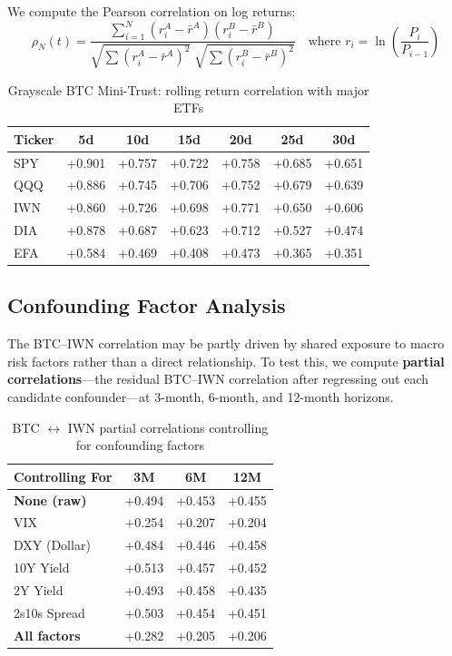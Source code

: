 \documentclass[11pt,letterpaper]{article}
\begin{document}
We compute the Pearson correlation on log returns:
\[
  \rho_{N}(t) = \frac{\sum_{i=1}^{N}(r^{A}_i - \bar{r}^{A})(r^{B}_i - \bar{r}^{B})}
  {\sqrt{\sum(r^{A}_i - \bar{r}^{A})^2}\;\sqrt{\sum(r^{B}_i - \bar{r}^{B})^2}}
  \quad\text{where } r_i = \ln\!\left(\frac{P_i}{P_{i-1}}\right)
\]

\begin{table}[H]
\centering
\caption{Grayscale BTC Mini-Trust: rolling return correlation with major ETFs}
\begin{tabular}{lcccccc}
\toprule
Ticker & 5d & 10d & 15d & 20d & 25d & 30d \\
\midrule
SPY & \textcolor{loss}{+0.901} & \textcolor{loss}{+0.757} & \textcolor{loss}{+0.722} & \textcolor{loss}{+0.758} & \textcolor{loss}{+0.685} & \textcolor{loss}{+0.651} \\
QQQ & \textcolor{loss}{+0.886} & \textcolor{loss}{+0.745} & \textcolor{loss}{+0.706} & \textcolor{loss}{+0.752} & \textcolor{loss}{+0.679} & \textcolor{loss}{+0.639} \\
IWN & \textcolor{loss}{+0.860} & \textcolor{loss}{+0.726} & \textcolor{loss}{+0.698} & \textcolor{loss}{+0.771} & \textcolor{loss}{+0.650} & \textcolor{loss}{+0.606} \\
DIA & \textcolor{loss}{+0.878} & \textcolor{loss}{+0.687} & \textcolor{loss}{+0.623} & \textcolor{loss}{+0.712} & +0.527 & +0.474 \\
EFA & +0.584 & +0.469 & +0.408 & +0.473 & +0.365 & +0.351 \\
\bottomrule
\end{tabular}
\end{table}

\subsection{Confounding Factor Analysis}

The BTC--IWN correlation may be partly driven by shared exposure to macro
risk factors rather than a direct relationship. To test this, we compute
\textbf{partial correlations}---the residual BTC--IWN correlation after
regressing out each candidate confounder---at 3-month, 6-month, and
12-month horizons.

\begin{table}[H]
\centering
\caption{BTC $\leftrightarrow$ IWN partial correlations controlling for confounding factors}
\begin{tabular}{lccc}
\toprule
Controlling For & 3M & 6M & 12M \\
\midrule
\textbf{None (raw)} & +0.494 & +0.453 & +0.455 \\
VIX & +0.254 & +0.207 & +0.204 \\
DXY (Dollar) & +0.484 & +0.446 & +0.458 \\
10Y Yield & +0.513 & +0.457 & +0.452 \\
2Y Yield & +0.493 & +0.458 & +0.435 \\
2s10s Spread & +0.503 & +0.454 & +0.451 \\
\midrule
\textbf{All factors} & +0.282 & +0.205 & +0.206 \\
\bottomrule
\end{tabular}
\end{table}
\end{document}
